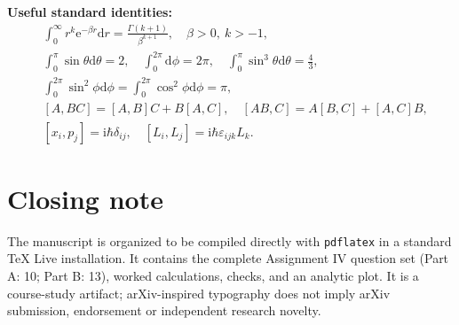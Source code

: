\documentclass[11pt,a4paper]{article}
\newcommand{\dd}{\mathrm{d}}
\newcommand{\iu}{\mathrm{i}}
\newcommand{\ee}{\mathrm{e}}
\begin{document}
\textbf{Useful standard identities:}
\begin{align*}
&\int_0^\infty r^k\ee^{-\beta r}\dd r=\frac{\Gamma(k+1)}{\beta^{k+1}},\quad\beta>0,\ k>-1,\\
&\int_0^\pi\sin\theta\dd\theta=2,\quad\int_0^{2\pi}\dd\phi=2\pi,\quad\int_0^\pi\sin^3\theta\dd\theta=\frac43,\\
&\int_0^{2\pi}\sin^2\phi\dd\phi=\int_0^{2\pi}\cos^2\phi\dd\phi=\pi,\\
&[A,BC]=[A,B]C+B[A,C],\quad[AB,C]=A[B,C]+[A,C]B,\\
&[x_i,p_j]=\iu\hbar\delta_{ij},\quad[L_i,L_j]=\iu\hbar\varepsilon_{ijk}L_k.
\end{align*}

\section*{Closing note}
The manuscript is organized to be compiled directly with \texttt{pdflatex} in a standard TeX Live installation. It contains the complete Assignment IV question set (Part A: 10; Part B: 13), worked calculations, checks, and an analytic plot. It is a course-study artifact; arXiv-inspired typography does not imply arXiv submission, endorsement or independent research novelty.
\end{document}
